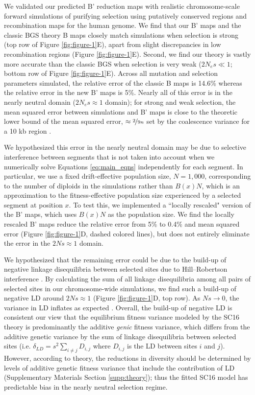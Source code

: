 \documentclass[11pt]{article}
\begin{document}
We validated our predicted B' reduction maps with realistic chromosome-scale
forward simulations of purifying selection using putatively conserved regions and recombination maps for the human genome. We find that
our B' maps and the classic BGS theory B maps closely match simulations when
selection is strong (top row of Figure \ref{fig:figure-1}E), apart from slight
discrepancies in low recombination regions (Figure \ref{fig:figure-1}E).
Second, we find our theory is vastly more accurate than the classic BGS when
selection is very weak ($2N_e s \ll 1$; bottom row of Figure
\ref{fig:figure-1}E). Across all mutation and selection parameters simulated,
the relative error of the classic B maps is 14.6\% whereas the relative error
in the new B' maps is 5\%. Nearly all of this error is in the nearly neutral
domain ($2N_e s \approx 1$ domain); for strong and weak selection, the mean
squared error between simulations and B' maps is close to the theoretic lower
bound of the mean squared error, $\approx \nicefrac{2}{9n}$ set by the coalescence variance for a 10 kb region
\parencite{Tajima1983-gu}.

We hypothesized this error in the nearly neutral domain may be due to selective
interference between segments that is not taken into account when we
numerically solve Equations \eqref{eq:main_eqns} independently for each
segment. In particular, we use a fixed drift-effective population size, $N=1,000$, corresponding 
to the number of diploids in the simulations rather than $B(x) N$, which is an approximation to 
the fitness-effective population size experienced by a selected segment at position $x$. To test 
this, we implemented a ``locally rescaled" version of the B' maps, which uses $B(x)N$ as the population size. We find the locally rescaled B' maps reduce the relative error from 5\% to 0.4\% and mean squared error (Figure \ref{fig:figure-1}D, dashed colored lines), but does not entirely eliminate the error in the $2Ns \approx 1$ domain. 

We hypothesized that the remaining error could be due to the build-up
of negative linkage disequilibria between selected sites due to Hill--Robertson
interference \parencite{Hill1966-kd,McVean2000-bt,Comeron2007-wq}. By
calculating the sum of all linkage disequilibria among all pairs of selected sites in our chromosome-wide simulations, we find such a build-up of negative LD around $2Ns \approx 1$
(Figure \ref{fig:figure-1}D, top row). As $Ns \to 0$, the variance in LD
inflates as expected \parencite{Ohta1969-ae,Hill1968-ue}. Overall, the build-up
of negative LD is consistent our view that the equilibrium fitness variance
modeled by the SC16 theory is predominantly the additive \emph{genic} fitness variance, which differs from the additive genetic variance by the sum of linkage disequilibria
between selected sites (i.e. $\delta_{LD} = s^2 \sum_{i\ne j} D_{i,j}$ where
$D_{i,j}$ is the LD between sites $i$ and $j$). However, according to theory,
the reductions in diversity should be determined by levels of additive genetic
fitness variance that include the contribution of LD (Supplementary Materials
Section \ref{supp:theory}); thus the fitted SC16 model has predictable bias in the nearly neutral selection regime.
\end{document}
